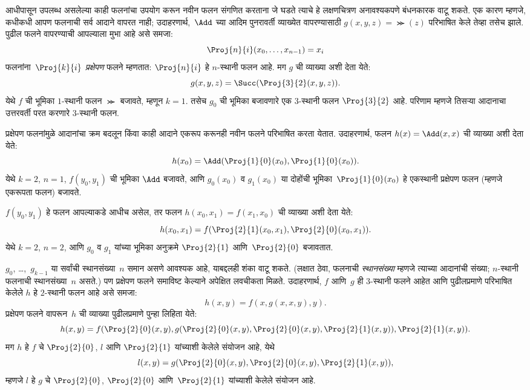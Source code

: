 आधीपासून उपलब्ध असलेल्या काही फलनांचा उपयोग करून नवीन फलन संगणित करताना
जे घडते त्याचे हे लक्षणचित्रण अनावश्यकपणे बंधनकारक वाटू शकते. एक कारण
म्हणजे, कधीकधी आपण फलनाची सर्व आदाने वापरत नाही; उदाहरणार्थ,~$\Add$
च्या आदिम पुनरावर्ती व्याख्येत वापरण्यासाठी $g(x, y, z) = \Succ(z)$
परिभाषित केले तेव्हा तसेच झाले. पुढील फलने वापरण्याची आपल्याला मुभा आहे
असे समजा:
\[\Proj{n}{i}(x_0, \dots, x_{n-1}) = x_i
\]
फलनांना~$\Proj{k}{i}$ \emph{प्रक्षेपण} फलने म्हणतात:
$\Proj{n}{i}$ हे $n$-स्थानी फलन आहे. मग $g$ ची व्याख्या अशी देता येते:
\[g(x, y, z) = \Succ(\Proj{3}{2}(x, y, z)).
\]
येथे $f$ ची भूमिका $1$-स्थानी फलन $\Succ$ बजावते, म्हणून $k=1$.
तसेच $g_0$ ची भूमिका बजावणारे एक $3$-स्थानी फलन $\Proj{3}{2}$ आहे.
परिणाम म्हणजे तिसऱ्या आदानाचा उत्तरवर्ती परत करणारे $3$-स्थानी फलन.

प्रक्षेपण फलनांमुळे आदानांचा क्रम बदलून किंवा काही आदाने एकरूप करूनही
नवीन फलने परिभाषित करता येतात. उदाहरणार्थ, फलन $h(x) = \Add(x, x)$ ची
व्याख्या अशी देता येते:
\[h(x_0) = \Add(\Proj{1}{0}(x_0),\Proj{1}{0}(x_0)).
\]
येथे $k=2$, $n=1$, $f(y_0,y_1)$ ची भूमिका $\Add$ बजावते, आणि
$g_0(x_0)$ व $g_1(x_0)$ या दोहोंची भूमिका~$\Proj{1}{0}(x_0)$ हे
एकस्थानी प्रक्षेपण फलन (म्हणजे एकरूपता फलन) बजावते.

$f(y_0, y_1)$ हे फलन आपल्याकडे आधीच असेल, तर फलन
$h(x_0, x_1) = f(x_1, x_0)$ ची व्याख्या अशी देता येते:
\[h(x_0, x_1) = f(\Proj{2}{1}(x_0, x_1),\Proj{2}{0}(x_0, x_1)).
\]
येथे $k=2$, $n = 2$, आणि $g_0$ व $g_1$ यांच्या भूमिका अनुक्रमे
$\Proj{2}{1}$ आणि~$\Proj{2}{0}$ बजावतात.

$g_0$, \dots,~$g_{k-1}$ या सर्वांची स्थानसंख्या~$n$ समान असणे आवश्यक
आहे, याबद्दलही शंका वाटू शकते. (लक्षात ठेवा, फलनाची \emph{स्थानसंख्या}
म्हणजे त्याच्या आदानांची संख्या; $n$-स्थानी फलनाची स्थानसंख्या~$n$
असते.) पण प्रक्षेपण फलने समाविष्ट केल्याने अपेक्षित लवचीकता मिळते.
उदाहरणार्थ, $f$ आणि~$g$ ही $3$-स्थानी फलने आहेत आणि पुढीलप्रमाणे
परिभाषित केलेले $h$ हे $2$-स्थानी फलन आहे असे समजा:
\[h(x,y) = f(x,g(x,x,y),y).
\]
प्रक्षेपण फलने वापरून~$h$ ची व्याख्या पुढीलप्रमाणे पुन्हा लिहिता येते:
\[h(x,y) = f(\Proj{2}{0}(x,y), g(\Proj{2}{0}(x,y), \Proj{2}{0}(x,y),
\Proj{2}{1}(x,y)), \Proj{2}{1}(x,y)).
\]
मग $h$ हे $f$ चे $\Proj{2}{0}$, $l$ आणि $\Proj{2}{1}$ यांच्याशी
केलेले संयोजन आहे, येथे
\[l(x,y) = g(\Proj{2}{0}(x,y),\Proj{2}{0}(x,y),\Proj{2}{1}(x,y)),
\]
म्हणजे $l$ हे $g$ चे $\Proj{2}{0}$, $\Proj{2}{0}$ आणि~$\Proj{2}{1}$
यांच्याशी केलेले संयोजन आहे.











